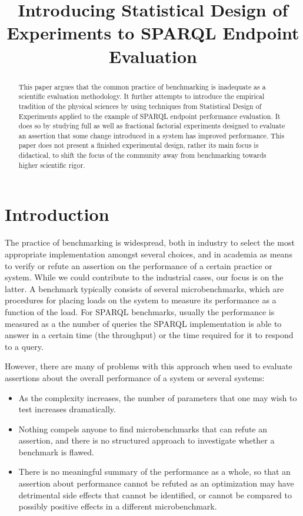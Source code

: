 \documentclass{llncs}
\title{Introducing Statistical Design of Experiments to SPARQL
  Endpoint Evaluation}
\begin{document}
\maketitle

\begin{abstract}
This paper argues that the common practice of benchmarking is
inadequate as a scientific evaluation methodology. It further attempts
to introduce the empirical tradition of the physical sciences by using
techniques from Statistical Design of Experiments applied to the
example of SPARQL endpoint performance evaluation. It does so by
studying full as well as fractional factorial experiments designed to
evaluate an assertion that some change introduced in a system has
improved performance. This paper does not present a finished
experimental design, rather its main focus is didactical, to shift the
focus of the community away from benchmarking towards higher
scientific rigor.
\end{abstract}

\section{Introduction}

The practice of benchmarking is widespread, both in industry to select
the most appropriate implementation amongst several choices, and in
academia as means to verify or refute an assertion on the performance
of a certain practice or system. While we could contribute to the
industrial cases, our focus is on the latter. A benchmark typically
consists of several microbenchmarks, which are procedures for placing
loads on the system to measure its performance as a function of the
load. For SPARQL benchmarks, usually the performance is measured as a
the number of queries the SPARQL implementation is able to answer in a
certain time (the throughput) or the time required for it to respond
to a query.

However, there are many of problems with this approach when used to
evaluate assertions about the overall performance of a system or
several systems: 
\begin{itemize}
\item As the complexity increases, the number of parameters that
one may wish to test increases dramatically.
\item Nothing compels anyone to find microbenchmarks that
  can refute an assertion, and there is no structured approach to
  investigate whether a benchmark is flawed.
\item There is no meaningful summary of the performance as a whole, so
  that an assertion about performance cannot be refuted as an
  optimization may have detrimental side effects that cannot be
  identified, or cannot be compared to possibly positive effects in a
  different microbenchmark.
\end{itemize}
\end{document}
